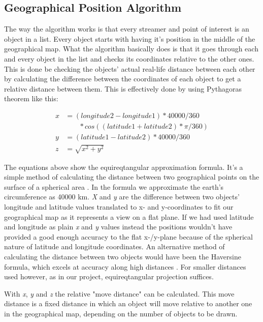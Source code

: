 \subsection{Geographical Position Algorithm}
\label{sec:geoalgorithm}

The way the algorithm works is that every streamer and point of interest is an object in a list. Every object starts with having it's position in the middle of the geographical map. What the algorithm basically does is that it goes through each and every object in the list and checks its coordinates relative to the other ones. This is done be checking the objects' actual real-life distance between each other by calculating the difference between the coordinates of each object to get a relative distance between them. This is effectively done by using Pythagoras theorem like this:

\begin{align*}
x &= (longitude2-longitude1)*40000/360  \\
 &\phantom{b=\,} *cos((latitude1+latitude2) * \pi/360) \nonumber \\
y &= (latitude1-latitude2)*40000/360 \\
z &= \sqrt{x^2+y^2}
\end{align*}

The equations above show the equireqtangular approximation formula. It's a simple method of calculating the distance between two geographical points on the surface of a spherical area \cite{equi}. In the formula we approximate the earth's circumference as 40000 km. \textit{X} and \textit{y} are the difference between two objects' longitude and latitude values translated to x- and y-coordinates to fit our geographical map as it represents a view on a flat plane. If we had used latitude and longitude as plain \textit{x} and \textit{y} values instead the positions wouldn't have provided a good enough accuracy to the flat x-/y-plane because of the spherical nature of latitude and longitude coordinates. An alternative method of calculating the distance between two objects would have been the Haversine formula, which excels at accuracy along high distances \cite{haversine}. For smaller distances used however, as in our project, equireqtangular projection suffices.

With \textit{x}, \textit{y} and \textit{z} the relative "move distance" can be calculated. This move distance is a fixed distance in which an object will move relative to another one in the geographical map, depending on the number of objects to be drawn.

